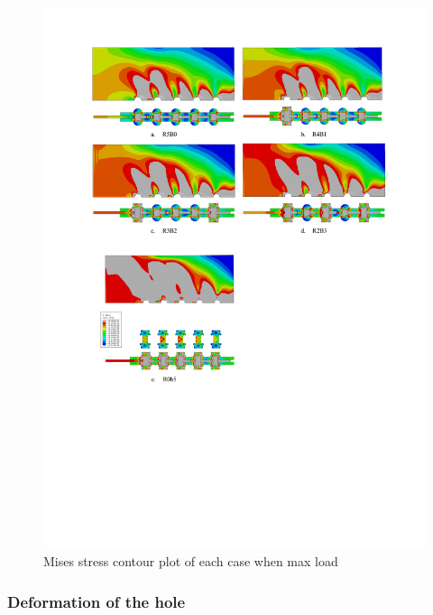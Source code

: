 \begin{figure}[htbp]
    \centering
    \includegraphics[width=1\linewidth]{imgs//ch4/fig-5rulscount.pdf}
    \caption{Mises stress contour plot of each case when max load}
    \label{fig-5rulscount}
\end{figure}

\subsubsection{Deformation of the hole}

